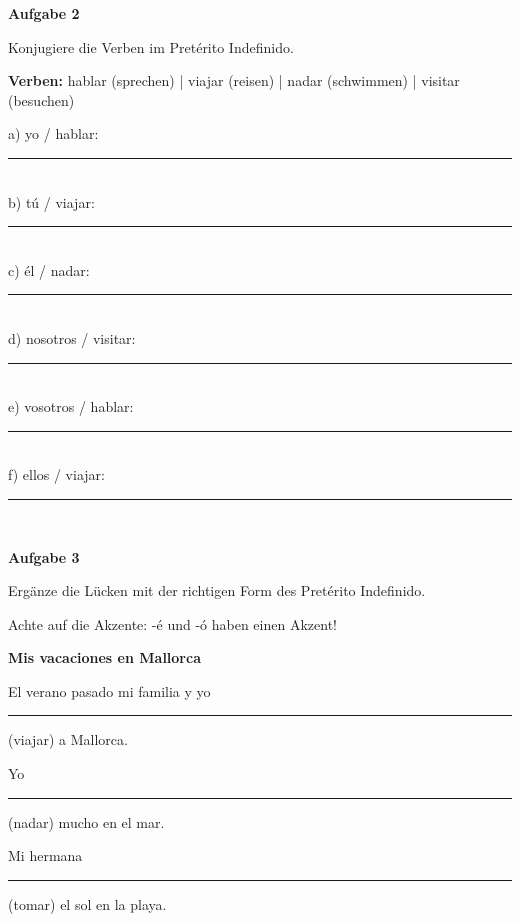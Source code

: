 \documentclass[11pt, a4paper]{article}
\newcommand{\fachfarbe}{spanisch}
\newcommand{\punktebox}[1]{\hfill\fbox{\small \_/#1}}
\newcommand{\luecke}[1]{\rule{#1}{0.4pt}}
\newenvironment{aufgabe}[1]{%
    \needspace{5\baselineskip}%
    \nopagebreak[4]%
    \vspace{10pt}
    \noindent\textbf{\textcolor{\fachfarbe}{Aufgabe #1}}
    \nopagebreak[4]%
    \vspace{5pt}
    \nopagebreak[4]%
    \begin{list}{}{\leftmargin=0pt}
    \item[]
}{%
    \end{list}
}
\begin{document}
\begin{aufgabe}{2}
Konjugiere die Verben im Pretérito Indefinido. \punktebox{6}
\end{aufgabe}

\begin{vokabelkasten}
\textbf{Verben:} hablar (sprechen) | viajar (reisen) | nadar (schwimmen) | visitar (besuchen)
\end{vokabelkasten}

\vspace{0.5em}

\noindent
a) yo / hablar: \luecke{3cm} \\[0.8em]
b) tú / viajar: \luecke{3cm} \\[0.8em]
c) él / nadar: \luecke{3cm} \\[0.8em]
d) nosotros / visitar: \luecke{3cm} \\[0.8em]
e) vosotros / hablar: \luecke{3cm} \\[0.8em]
f) ellos / viajar: \luecke{3cm} \\

\vspace{15pt}


\begin{aufgabe}{3}
Ergänze die Lücken mit der richtigen Form des Pretérito Indefinido. \punktebox{6}
\end{aufgabe}

\begin{hinweis}
Achte auf die Akzente: -é und -ó haben einen Akzent!
\end{hinweis}

\vspace{0.5em}

\noindent
\textbf{Mis vacaciones en Mallorca}

\vspace{0.5em}

\noindent
El verano pasado mi familia y yo \luecke{3cm} (viajar) a Mallorca.

\vspace{0.5em}

\noindent
Yo \luecke{3cm} (nadar) mucho en el mar.

\vspace{0.5em}

\noindent
Mi hermana \luecke{3cm} (tomar) el sol en la playa.
\end{document}
